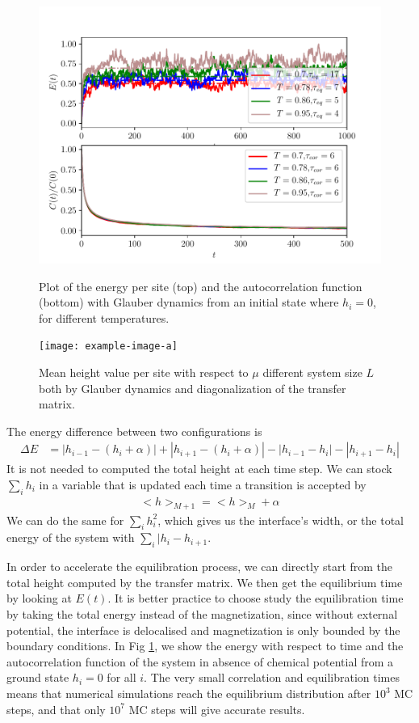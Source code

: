 \begin{figure}
	\centering
	\includegraphics[scale=1]{numerical/sos-glau-eq-cor.pdf}
	\caption{Plot of the energy per site (top) and the autocorrelation function (bottom) with Glauber dynamics from an initial state where $h_i=0$, for different temperatures.}
	\label{eq-glau}
	\texttt{[image: example-image-a]}
	\caption{Mean height value per site with respect to $\mu$ different system size $L$ both by Glauber dynamics and diagonalization of the transfer matrix.}
	\label{eq-glau}	
\end{figure}

The energy difference between two configurations is
\begin{align}
	\Delta E &= |h_{i-1}-(h_i + \alpha)| + |h_{i+1}-(h_i + \alpha)| - |h_{i-1}-h_i| - |h_{i+1}-h_i|  
\end{align}
It is not needed to computed the total height at each time step. We can stock $\sum_i h_i$ in a variable that is updated each time a transition is accepted by
\begin{align}
    <h>_{M+1} = <h>_M + \alpha
\end{align}
We can do the same for $\sum_i h_i^2$, which gives us the interface's width, or the total energy of the system with $\sum_i |h_i - h_{i+1}$.

In order to accelerate the equilibration process, we can directly start from the total height computed by the transfer matrix. We then get the equilibrium time by looking at $E(t)$. It is better practice to choose study the equilibration time by taking the total energy instead of the magnetization, since without external potential, the interface is delocalised and magnetization is only bounded by the boundary conditions. In Fig \ref{eq-glau}, we show the energy with respect to time and the autocorrelation function of the system in absence of chemical potential from a ground state $h_i=0$ for all $i$. The very small correlation and equilibration times means that numerical simulations reach the equilibrium distribution after $10^3$ MC steps, and that only $10^7$ MC steps will give accurate results.

